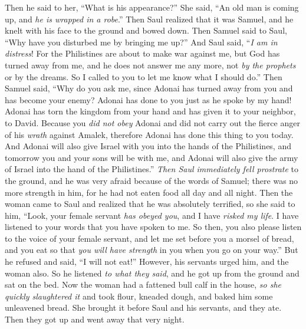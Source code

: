 \begin{biblechapter}
\verse Then he said to her, “What is his appearance?” She said, “An old man is coming up, and \textit{he is wrapped in a robe}.” Then Saul realized that it was Samuel, and he knelt with his face to the ground and bowed down.
\verse Then Samuel said to Saul, “Why have you disturbed me by bringing me up?” And Saul said, “\textit{I am in distress}! For the Philistines are about to make war against me, but God has turned away from me, and he does not answer me any more, not \textit{by the prophets} or by the dreams. So I called to you to let me know what I should do.”
\verse Then Samuel said, “Why do you ask me, since Adonai has turned away from you and has become your enemy?
\verse Adonai has done to you just as he spoke by my hand! Adonai has torn the kingdom from your hand and has given it to your neighbor, to David.
\verse Because you \textit{did not obey} Adonai and did not carry out the fierce anger of his \textit{wrath} against Amalek, therefore Adonai has done this thing to you today.
\verse And Adonai will also give Israel with you into the hands of the Philistines, and tomorrow you and your sons will be with me, and Adonai will also give the army of Israel into the hand of the Philistines.”
\verse \textit{Then Saul immediately fell prostrate} to the ground, and he was very afraid because of the words of Samuel; there was no more strength in him, for he had not eaten food all day and all night.
\verse Then the woman came to Saul and realized that he was absolutely terrified, so she said to him, “Look, your female servant \textit{has obeyed you}, and I have \textit{risked my life}. I have listened to your words that you have spoken to me.
\verse So then, you also please listen to the voice of your female servant, and let me set before you a morsel of bread, and you eat so that \textit{you will have strength} in you when you go on your way.”
\verse But he refused and said, “I will not eat!” However, his servants urged him, and the woman also. So he listened \textit{to what they said}, and he got up from the ground and sat on the bed.
\verse Now the woman had a fattened bull calf in the house, \textit{so she quickly slaughtered it} and took flour, kneaded dough, and baked him some unleavened bread.
\verse She brought it before Saul and his servants, and they ate. Then they got up and went away that very night.
\end{biblechapter}

